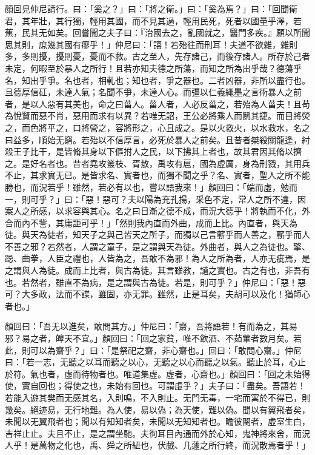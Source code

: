 
\begin{pinyinscope}
顏回見仲尼請行。曰：「奚之？」曰：「將之衛。」曰：「奚為焉？」曰：「回聞衛君，其年壯，其行獨，輕用其國，而不見其過，輕用民死，死者以國量乎澤，若蕉，民其无如矣。回嘗聞之夫子曰：『治國去之，亂國就之，醫門多疾。』願以所聞思其則，庶幾其國有瘳乎！」仲尼曰：「譆！若殆往而刑耳！夫道不欲雜，雜則多，多則擾，擾則憂，憂而不救。古之至人，先存諸己，而後存諸人。所存於己者未定，何暇至於暴人之所行！且若亦知夫德之所蕩，而知之所為出乎哉？德蕩乎名，知出乎爭。名也者，相軋也；知也者，爭之器也。二者凶器，非所以盡行也。且德厚信矼，未達人氣；名聞不爭，未達人心。而彊以仁義繩墨之言術暴人之前者，是以人惡有其美也，命之曰菑人。菑人者，人必反菑之，若殆為人菑夫！且苟為悅賢而惡不肖，惡用而求有以異？若唯无詔，王公必將乘人而鬭其捷。而目將熒之，而色將平之，口將營之，容將形之，心且成之。是以火救火，以水救水，名之曰益多，順始无窮。若殆以不信厚言，必死於暴人之前矣。且昔者桀殺關龍逢，紂殺王子比干，是皆脩其身以下傴拊人之民，以下拂其上者也，故其君因其脩以擠之。是好名者也。昔者堯攻叢枝、胥敖，禹攻有扈，國為虛厲，身為刑戮，其用兵不止，其求實无已。是皆求名、實者也，而獨不聞之乎？名、實者，聖人之所不能勝也，而況若乎！雖然，若必有以也，嘗以語我來！」顏回曰：「端而虛，勉而一，則可乎？」曰：「惡！惡可？夫以陽為充孔揚，采色不定，常人之所不違，因案人之所感，以求容與其心。名之曰日漸之德不成，而況大德乎！將執而不化，外合而內不訾，其庸詎可乎！」「然則我內直而外曲，成而上比。內直者，與天為徒。與天為徒者，知天子之與己皆天之所子，而獨以己言蘄乎而人善之，蘄乎而人不善之邪？若然者，人謂之童子，是之謂與天為徒。外曲者，與人之為徒也。擎、跽、曲拳，人臣之禮也，人皆為之，吾敢不為邪！為人之所為者，人亦无疵焉，是之謂與人為徒。成而上比者，與古為徒。其言雖教，讁之實也。古之有也，非吾有也。若然者，雖直不為病，是之謂與古為徒。若是，則可乎？」仲尼曰：「惡！惡可？大多政，法而不諜，雖固，亦无罪。雖然，止是耳矣，夫胡可以及化！猶師心者也。」

顏回曰：「吾无以進矣，敢問其方。」仲尼曰：「齋，吾將語若！有而為之，其易邪？易之者，皞天不宜。」顏回曰：「回之家貧，唯不飲酒、不茹葷者數月矣。若此，則可以為齋乎？」曰：「是祭祀之齋，非心齋也。」回曰：「敢問心齋。」仲尼曰：「若一志，无聽之以耳而聽之以心，无聽之以心而聽之以氣。聽止於耳，心止於符。氣也者，虛而待物者也。唯道集虛。虛者，心齋也。」顏回曰：「回之未始得使，實自回也；得使之也，未始有回也。可謂虛乎？」夫子曰：「盡矣。吾語若！若能入遊其樊而无感其名，入則鳴，不入則止。无門无毒，一宅而寓於不得已，則幾矣。絕迹易，无行地難。為人使，易以偽；為天使，難以偽。聞以有翼飛者矣，未聞以无翼飛者也；聞以有知知者矣，未聞以无知知者也。瞻彼闋者，虛室生白，吉祥止止。夫且不止，是之謂坐馳。夫徇耳目內通而外於心知，鬼神將來舍，而況人乎！是萬物之化也，禹、舜之所紐也，伏戲、几蘧之所行終，而況散焉者乎！」


\end{pinyinscope}
